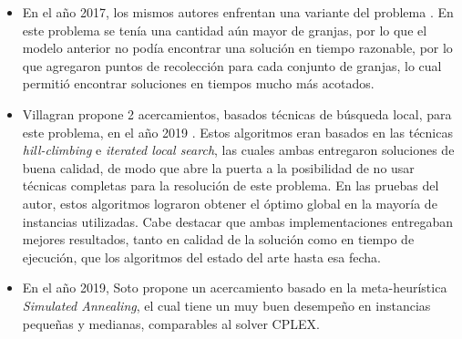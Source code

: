 \begin{itemize}
    \item En el año 2017, los mismos autores enfrentan una variante del problema \cite{MilkBlendingPoints}. En este problema se tenía una cantidad aún mayor de granjas, por lo que el modelo anterior no podía encontrar una solución en tiempo razonable, por lo que agregaron puntos de recolección para cada conjunto de granjas, lo cual permitió encontrar soluciones en tiempos mucho más acotados.

    \item Villagran propone 2 acercamientos, basados técnicas de búsqueda local, para este problema, en el año 2019 \cite{Lechemezclada2}. Estos algoritmos eran basados en las técnicas \textit{hill-climbing} e \textit{iterated local search}, las cuales ambas entregaron soluciones de buena calidad, de modo que abre la puerta a la posibilidad de no usar técnicas completas para la resolución de este problema. En las pruebas del autor, estos algoritmos lograron obtener el óptimo global en la mayoría de instancias utilizadas. Cabe destacar que ambas implementaciones entregaban mejores resultados, tanto en calidad de la solución como en tiempo de ejecución, que los algoritmos del estado del arte hasta esa fecha.
    
    \item En el año 2019, Soto \cite{LecheConMezclaAnnealing} propone un acercamiento basado en la meta-heurística \textit{Simulated Annealing}, el cual tiene un muy buen desempeño en instancias pequeñas y medianas, comparables al solver CPLEX.

\end{itemize}

